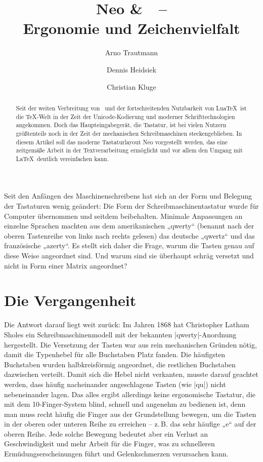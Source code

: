 \documentclass[ngerman]{dtk}
\title{Neo \&\ \XeLaTeX\ –\\ Ergonomie und Zeichenvielfalt}
\author{Arno Trautmann\and Dennis Heidsiek\and Christian Kluge}
\newcommand\LuaTeX{Lua\TeX}
\begin{document}
\maketitle
\begin{abstract}
Seit der weiten Verbreitung von \XeTeX\ und der fortschreitenden Nutzbarkeit von \LuaTeX\ ist die \TeX-Welt in der Zeit der Unicode-Kodierung und moderner Schrifttechnologien angekommen. Doch das Haupteingabegerät, die Tastatur, ist bei vielen Nutzern größtenteils noch in der Zeit der mechanischen Schreibmaschinen steckengeblieben. In diesem Artikel soll das moderne Tastaturlayout Neo vorgestellt werden, das eine zeitgemäße Arbeit in der Textverarbeitung ermöglicht und vor allem den Umgang mit \LaTeX\ deutlich vereinfachen kann.
\end{abstract}
Seit den Anfängen des Maschinenschreibens hat sich an der Form und Belegung der Tastaturen wenig geändert: Die Form der Schreibmaschinentastatur wurde für Computer übernommen und seitdem beibehalten. Minimale Anpassungen an einzelne Sprachen machten aus dem amerikanischen „\hbox{qwerty}“ (benannt nach der oberen Tastenreihe von links nach rechts gelesen) das deutsche „qwertz“ und das französische „azerty“. Es stellt sich daher die Frage, warum die Tasten genau auf diese Weise angeordnet sind. Und warum sind sie überhaupt schräg versetzt und nicht in Form einer Matrix angeordnet?

\section{Die Vergangenheit}
Die Antwort darauf liegt weit zurück: Im Jahren 1868 hat Christopher Latham Sholes ein Schreibmaschinenmodell mit der bekannten |qwerty|-Anordnung hergestellt. \cite{patentqwerty} Die Versetzung der Tasten war aus rein mechanischen Gründen nötig, damit die Typenhebel für alle Buchstaben Platz fanden. Die häufigsten Buchstaben wurden halbkreisförmig angeordnet, die restlichen Buchstaben dazwischen verteilt. Damit sich die Hebel nicht verkanten, musste darauf geachtet werden, dass häufig nacheinander angeschlagene Tasten (wie |qu|) nicht nebeneinander lagen. Das alles ergibt allerdings keine ergonomische Tastatur, die mit dem 10-Finger-System blind, schnell und angenehm zu bedienen ist, denn man muss recht häufig die Finger aus der Grundstellung bewegen, um die Tasten in der oberen oder unteren Reihe zu erreichen – z.\,B. das sehr häufige „e“ auf der oberen Reihe. Jede solche Bewegung bedeutet aber ein Verlust an Geschwindigkeit und mehr Arbeit für die Finger, was zu schnelleren Ermüdungserscheinungen führt und Gelenkschmerzen verursachen kann.
\end{document}

